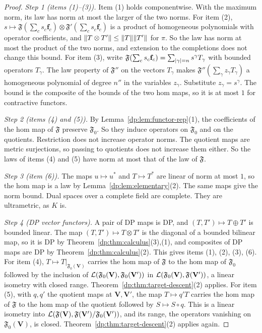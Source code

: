 \begin{proof}
\emph{Step 1 (items (1)--(3)).} Item (1) holds componentwise. With the maximum norm, its law has norm at most the larger of the two norms. For item (2), $s\mapsto\mathfrak F(\sum_cs_c\mathbf f_c)\otimes\mathfrak F'(\sum_cs_c\mathbf f_c)$ is a product of homogeneous polynomials with operator coefficients, and $\lVert T\otimes T'\rVert\le\lVert T\rVert\lVert T'\rVert$ for $\pi$. So the law has norm at most the product of the two norms, and extension to the completions does not change this bound. For item (3), write $\mathfrak F(\sum_cs_c\mathbf f_c)=\sum_{\lvert \gamma\rvert=n}s^\gamma T_\gamma$ with bounded operators $T_\gamma$. The law property of $\mathfrak F''$ on the vectors $T_\gamma$ makes $\mathfrak F''(\sum_\gamma z_\gamma T_\gamma)$ a homogeneous polynomial of degree $n''$ in the variables $z_\gamma$. Substitute $z_\gamma=s^\gamma$. The bound is the composite of the bounds of the two hom maps, so it is at most $1$ for contractive functors.

\emph{Step 2 (items (4) and (5)).} By Lemma~\ref{dp:lem:functor-rep}(1), the coefficients of the hom map of $\mathfrak F$ preserve $\mathfrak F_0$. So they induce operators on $\mathfrak F_0$ and on the quotients. Restriction does not increase operator norms. The quotient maps are metric surjections, so passing to quotients does not increase them either. So the laws of items (4) and (5) have norm at most that of the law of $\mathfrak F$.

\emph{Step 3 (item (6)).} The maps $u\mapsto u^*$ and $T\mapsto T^*$ are linear of norm at most $1$, so the hom map is a law by Lemma~\ref{dp:lem:elementary}(2). The same maps give the norm bound. Dual spaces over a complete field are complete. They are ultrametric, as $K$ is.

\emph{Step 4 (DP vector functors).} A pair of DP maps is DP, and $(T,T')\mapsto T\oplus T'$ is bounded linear. The map $(T,T')\mapsto T\otimes T'$ is the diagonal of a bounded bilinear map, so it is DP by Theorem~\ref{dp:thm:calculus}(3),(1), and composites of DP maps are DP by Theorem~\ref{dp:thm:calculus}(2). This gives items (1), (2), (3), (6). For item (4), $T\mapsto T|_{\mathfrak F_0(\mathbf V)}$ carries the hom map of $\mathfrak F$ to the hom map of $\mathfrak F_0$ followed by the inclusion of $\mathcal L(\mathfrak F_0(\mathbf V),\mathfrak F_0(\mathbf V'))$ in $\mathcal L(\mathfrak F_0(\mathbf V),\mathfrak F(\mathbf V'))$, a linear isometry with closed range. Theorem~\ref{dp:thm:target-descent}(2) applies. For item (5), with $q,q'$ the quotient maps at $\mathbf V,\mathbf V'$, the map $T\mapsto q'T$ carries the hom map of $\mathfrak F$ to the hom map of the quotient followed by $S\mapsto S\circ q$. This is a linear isometry into $\mathcal L(\mathfrak F(\mathbf V),\mathfrak F(\mathbf V')/\mathfrak F_0(\mathbf V'))$, and its range, the operators vanishing on $\mathfrak F_0(\mathbf V)$, is closed. Theorem~\ref{dp:thm:target-descent}(2) applies again.
\end{proof}

